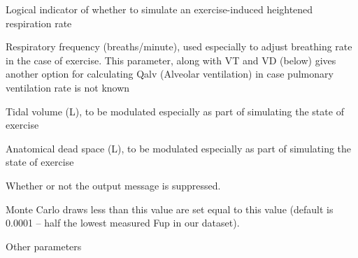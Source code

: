 \documentclass[a4paper]{book}
\begin{document}
\begin{Arguments}
\begin{ldescription}
\item[\code{exercise}] Logical indicator of whether to simulate an exercise-induced
heightened respiration rate

\item[\code{fR}] Respiratory frequency (breaths/minute), used especially to adjust
breathing rate in the case of exercise. This parameter, along with VT and VD
(below) gives another option for calculating Qalv (Alveolar ventilation) 
in case pulmonary ventilation rate is not known

\item[\code{VT}] Tidal volume (L), to be modulated especially as part of simulating
the state of exercise

\item[\code{VD}] Anatomical dead space (L), to be modulated especially as part of
simulating the state of exercise

\item[\code{suppress.messages}] Whether or not the output message is suppressed.

\item[\code{minimum.Funbound.plasma}] Monte Carlo draws less than this value are set 
equal to this value (default is 0.0001 -- half the lowest measured Fup in our
dataset).

\item[\code{...}] Other parameters
\end{ldescription}
\end{Arguments}
%
\end{document}
